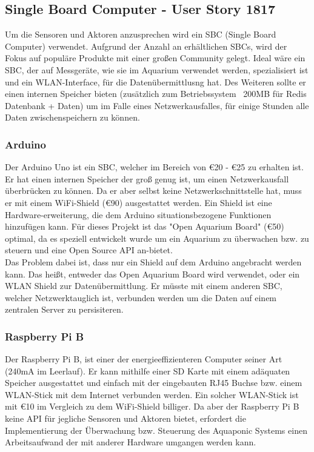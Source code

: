 \subsection{Single Board Computer - User Story 1817}
Um die Sensoren und Aktoren anzusprechen wird ein SBC (Single Board Computer) verwendet. Aufgrund der Anzahl an erh\"altlichen SBCs, wird der Fokus auf popul\"are Produkte mit einer gro{\ss}en Community gelegt. Ideal w\"are ein SBC, der auf Messger\"ate, wie sie im Aquarium verwendet werden, spezialisiert ist und ein WLAN-Interface, f\"ur die Daten\"ubermittlusng hat. Des Weiteren sollte er einen internen Speicher bieten (zusätzlich zum Betriebssystem ~200MB für Redis Datenbank + Daten) um im Falle eines Netzwerkausfalles, f\"ur einige Stunden alle Daten zwischenspeichern zu k\"onnen. 

\subsubsection{Arduino}
Der Arduino Uno ist ein SBC, welcher im Bereich von \euro20 - \euro25 zu erhalten ist. Er hat einen internen Speicher der gro{\ss} genug ist, um einen Netzwerkausfall \"uberbr\"ucken zu k\"onnen. Da er aber selbst keine Netzwerkschnittstelle hat, muss er mit einem WiFi-Shield (\euro 90) ausgestattet werden. Ein Shield ist eine Hardware-erweiterung, die dem Arduino situationsbezogene Funktionen hinzuf\"ugen kann. F\"ur dieses Projekt ist das "Open Aquarium Board" (\euro 50) optimal, da es speziell entwickelt wurde um ein Aquarium zu \"uberwachen bzw. zu steuern und eine Open Source API an-bietet. \\
Das Problem dabei ist, dass nur ein Shield auf dem Arduino angebracht werden kann. Das hei{\ss}t, entweder das Open Aquarium Board wird verwendet, oder ein WLAN Shield zur Daten\"ubermittlung. Er m\"usste mit einem anderen SBC, welcher Netzwerktauglich ist, verbunden werden um die Daten auf einem zentralen Server zu persisiteren.
\subsubsection{Raspberry Pi B}
Der Raspberry Pi B, ist einer der energieeffizienteren Computer seiner Art (240mA im Leerlauf). Er kann mithilfe einer SD Karte mit einem ad\"aquaten Speicher ausgestattet und einfach mit der eingebauten RJ45 Buchse bzw. einem WLAN-Stick mit dem Internet verbunden werden. Ein solcher WLAN-Stick ist mit \euro 10 im Vergleich zu dem WiFi-Shield billiger. Da aber der Raspberry Pi B keine API f\"ur jegliche Sensoren und Aktoren bietet, erfordert die Implementierung der \"Uberwachung bzw. Steuerung des Aquaponic Systems einen Arbeitsaufwand der mit anderer Hardware umgangen werden kann.
\newpage
